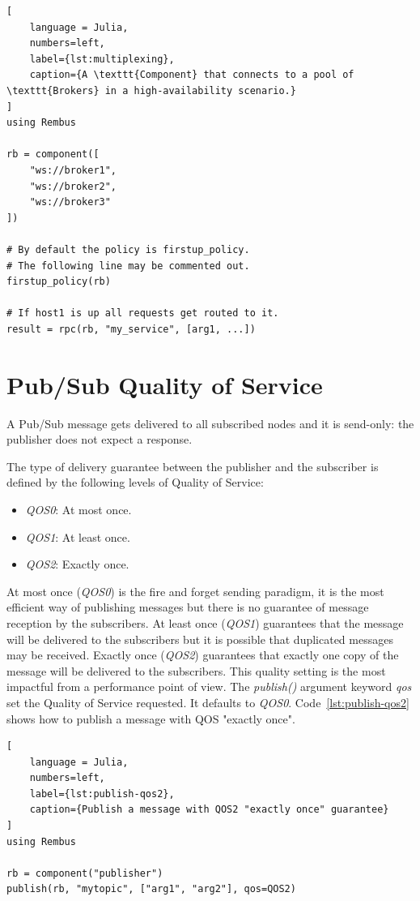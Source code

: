 \documentclass{juliacon}
\begin{document}
\begin{lstlisting}[
    language = Julia, 
    numbers=left, 
    label={lst:multiplexing}, 
    caption={A \texttt{Component} that connects to a pool of \texttt{Brokers} in a high-availability scenario.}
]
using Rembus

rb = component([
    "ws://broker1",
    "ws://broker2", 
    "ws://broker3"
])

# By default the policy is firstup_policy.
# The following line may be commented out.
firstup_policy(rb)

# If host1 is up all requests get routed to it.
result = rpc(rb, "my_service", [arg1, ...])
\end{lstlisting}

\section{Pub/Sub Quality of Service}

A Pub/Sub message gets delivered to all subscribed nodes and it is send-only: the publisher
does not expect a response. 

The type of delivery guarantee between the publisher and
the subscriber is defined by the following levels of Quality of Service:

\begin{itemize}
    \item \emph{QOS0}: At most once.
    \item \emph{QOS1}: At least once.
    \item \emph{QOS2}: Exactly once.
\end{itemize}

At most once (\emph{QOS0}) is the fire and forget sending paradigm, it is the most efficient way of
publishing messages but there is no guarantee of message reception by the subscribers.
\vskip 6pt
At least once (\emph{QOS1}) guarantees that the message will be delivered to the subscribers
but it is possible that duplicated messages may be received.
\vskip 6pt
Exactly once (\emph{QOS2}) guarantees that exactly one copy of the message will be delivered
to the subscribers. This quality setting is the most impactful from a performance point of view.
\vskip 6pt
The \emph{publish()} argument keyword \emph{qos} set the Quality of Service requested. It defaults to \emph{QOS0}.
\vskip 6pt
Code~\ref{lst:publish-qos2} shows how to publish a message with QOS "exactly once". 

\begin{lstlisting}[
    language = Julia, 
    numbers=left, 
    label={lst:publish-qos2}, 
    caption={Publish a message with QOS2 "exactly once" guarantee}
]
using Rembus

rb = component("publisher")
publish(rb, "mytopic", ["arg1", "arg2"], qos=QOS2)

\end{lstlisting}
\end{document}
